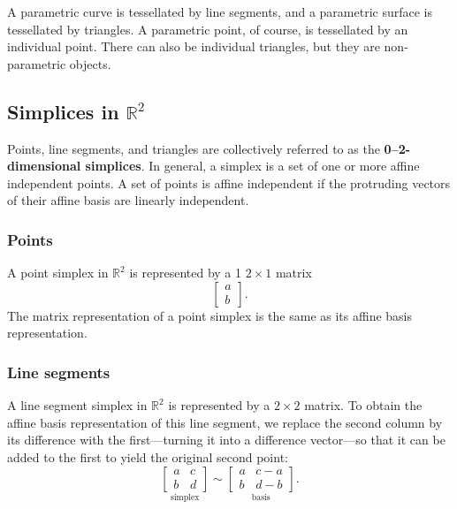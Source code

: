 A parametric curve is tessellated by line segments, and a parametric
surface is tessellated by triangles. A parametric point, of course,
is tessellated by an individual point. There can also be individual 
triangles, but they are non-parametric objects.

\subsection{Simplices in \texorpdfstring{\(\mathbb{R}^{2}\)}{R2}}

Points, line segments, and triangles are collectively referred to as the
\textbf{0--2-dimensional simplices}. In general, a simplex is a set of
one or more affine independent points. A set of points is affine independent if
the protruding vectors of their affine basis are linearly independent.

\subsubsection{Points}

A point simplex in \(\mathbb{R}^{2}\) is represented by a
1 \(2\times1\) matrix
\[
    \begin{bmatrix}
        a \\
        b 
    \end{bmatrix}.
\]
The matrix representation of a point simplex is the same as its affine
basis representation. 

\subsubsection{Line segments}

A line segment simplex in \(\mathbb{R}^{2}\) is represented by a 
\(2\times2\) matrix. To obtain the affine basis representation of this 
line segment, we replace the second column by its difference with the 
first---turning it into a difference vector---so that it can be added 
to the first to yield the original second point:
\[
    \underset{\mbox{simplex}}{
        \begin{bmatrix}
            a & c \\
            b & d
        \end{bmatrix}
    }
    \sim 
    \underset{\mbox{basis}}{
        \begin{bmatrix}
            a & c - a \\
            b & d - b
        \end{bmatrix}
    }.
\] 

